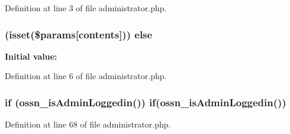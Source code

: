 Definition at line 3 of file administrator.\+php.

\subsubsection[{\texorpdfstring{else}{else}}]{ (isset(\$params\mbox{[}\textquotesingle{}contents\textquotesingle{}\mbox{]})) else}\hypertarget{theme_2page_2administrator_8php_ae0388a3b2d3bf8304fcd2f91d5783299}{}\label{theme_2page_2administrator_8php_ae0388a3b2d3bf8304fcd2f91d5783299}
{\bfseries Initial value\+:}


Definition at line 6 of file administrator.\+php.

\subsubsection[{\texorpdfstring{if}{if}}]{\setlength{\rightskip}{0pt plus 5cm}if ({\bf ossn\+\_\+is\+Admin\+Loggedin}()) if({\bf ossn\+\_\+is\+Admin\+Loggedin}())}\hypertarget{theme_2page_2administrator_8php_a8ed236a6397fa5eb5698db5d7f2bd495}{}\label{theme_2page_2administrator_8php_a8ed236a6397fa5eb5698db5d7f2bd495}


Definition at line 68 of file administrator.\+php.

